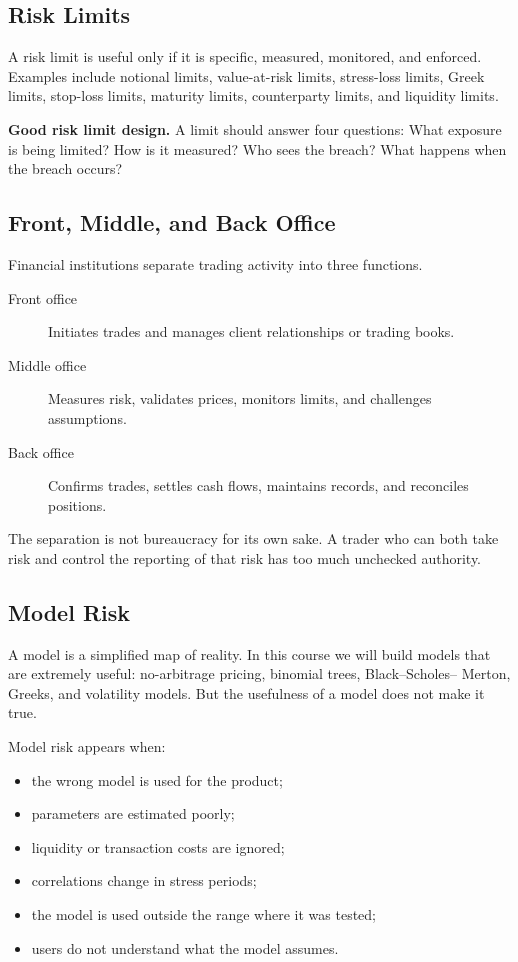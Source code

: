\subsection{Risk Limits}

A risk limit is useful only if it is specific, measured, monitored, and enforced.
Examples include notional limits, value-at-risk limits, stress-loss limits,
Greek limits, stop-loss limits, maturity limits, counterparty limits, and
liquidity limits.

\begin{boxD}
\textbf{Good risk limit design.} A limit should answer four questions:
What exposure is being limited? How is it measured? Who sees the breach? What
happens when the breach occurs?
\end{boxD}

\subsection{Front, Middle, and Back Office}

Financial institutions separate trading activity into three functions.
\begin{description}
    \item[Front office] Initiates trades and manages client relationships or
    trading books.
    \item[Middle office] Measures risk, validates prices, monitors limits, and
    challenges assumptions.
    \item[Back office] Confirms trades, settles cash flows, maintains records,
    and reconciles positions.
\end{description}

The separation is not bureaucracy for its own sake. A trader who can both take
risk and control the reporting of that risk has too much unchecked authority.

\subsection{Model Risk}

A model is a simplified map of reality. In this course we will build models that
are extremely useful: no-arbitrage pricing, binomial trees, Black--Scholes--
Merton, Greeks, and volatility models. But the usefulness of a model does not
make it true.

Model risk appears when:
\begin{itemize}
    \item the wrong model is used for the product;
    \item parameters are estimated poorly;
    \item liquidity or transaction costs are ignored;
    \item correlations change in stress periods;
    \item the model is used outside the range where it was tested;
    \item users do not understand what the model assumes.
\end{itemize}

